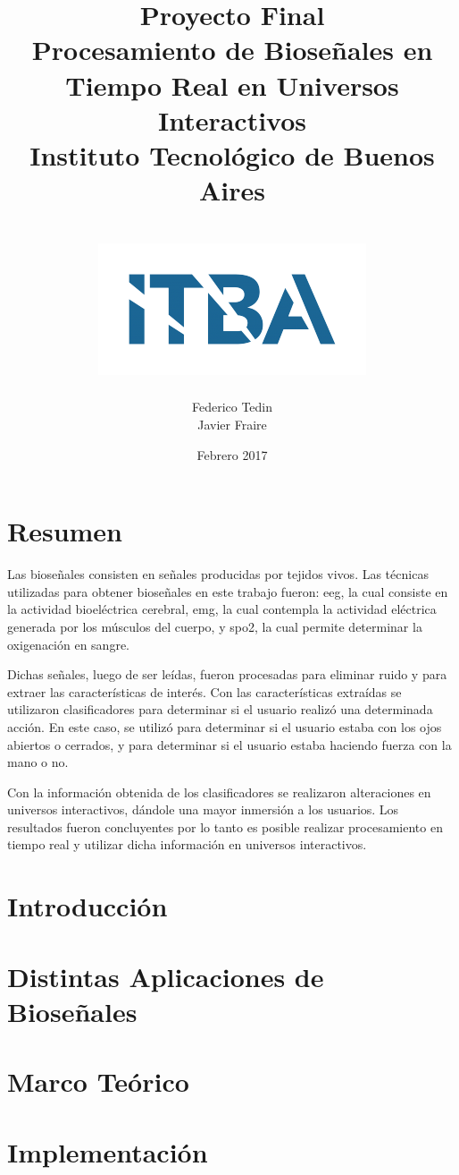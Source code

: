 \documentclass[a4paper]{report}
\title{
	{\LARGE Proyecto Final}\\
	{\Huge Procesamiento de Bioseñales en Tiempo Real en Universos Interactivos}\\
	{\large Instituto Tecnológico de Buenos Aires}\\~\\
	{\includegraphics{itba.png}}
}
\author{{Federico Tedin} \\ {Javier Fraire}}
\date{Febrero 2017}
\begin{document}
\maketitle

\chapter*{Resumen}
\justifying
Las bioseñales consisten en señales producidas por tejidos vivos. Las técnicas utilizadas para obtener bioseñales en este trabajo fueron: \gls{eeg}, la cual consiste en la actividad bioeléctrica cerebral, \gls{emg}, la cual contempla la actividad eléctrica generada por los músculos del cuerpo, y \gls{spo2}, la cual permite determinar la oxigenación en sangre.

Dichas señales, luego de ser leídas, fueron procesadas para eliminar ruido y para extraer las características de interés. Con las características extraídas se utilizaron clasificadores para determinar si el usuario realizó una determinada acción. En este caso, se utilizó para determinar si el usuario estaba con los ojos abiertos o cerrados, y para determinar si el usuario estaba haciendo fuerza con la mano o no.

Con la información obtenida de los clasificadores se realizaron alteraciones en universos interactivos, dándole una mayor inmersión a los usuarios. Los resultados fueron concluyentes por lo tanto es posible realizar procesamiento en tiempo real y utilizar dicha información en universos interactivos.

\tableofcontents

\chapter{Introducción}


\chapter{Distintas Aplicaciones de Bioseñales} \label{chap:biosignal-apps}


\chapter{Marco Teórico}


\chapter{Implementación}

\end{document}
